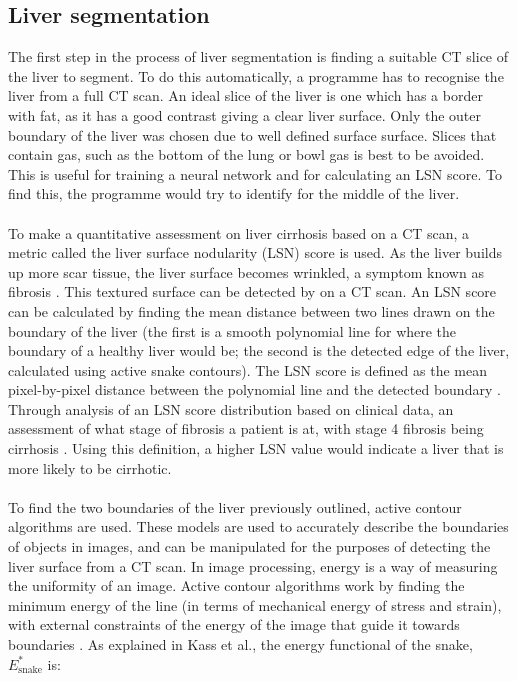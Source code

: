 \documentclass[12pt]{article}
\begin{document}
\subsection{Liver segmentation }
\label{lsn}
The first step in the process of liver segmentation is finding a suitable CT slice of the liver to segment. To do this automatically, a programme has to recognise the liver from a full CT scan. An ideal slice of the liver is one which has a border with fat, as it has a good contrast giving a clear liver surface. Only the outer boundary of the liver was chosen due to well defined surface surface. Slices that contain gas, such as the bottom of the lung or bowl gas is best to be avoided. This is useful for training a neural network and for calculating an LSN score. To find this, the programme would try to identify for the middle of the liver. 
\\ \\ 
To make a quantitative assessment on liver cirrhosis based on a CT scan, a metric called the liver surface nodularity (LSN) score is used. As the liver builds up more scar tissue, the liver surface becomes wrinkled, a symptom known as fibrosis \cite{Wynn:2008aa}. This textured surface can be detected by on a CT scan. An LSN score can be calculated by finding the mean distance between two lines drawn on the boundary of the liver (the first is a smooth polynomial line for where the boundary of a healthy liver would be; the second is the detected edge of the liver, calculated using active snake contours). The LSN score is defined as the mean pixel-by-pixel distance between the polynomial line and the detected boundary \cite{Smith:2016aa} \cite{Sartoris:2018aa} \cite{Kim:2019aa}.  Through analysis of an LSN score distribution based on clinical data, an assessment of what stage of fibrosis a patient is at, with stage 4 fibrosis being cirrhosis \cite{Schuppan:2008aa}. Using this definition, a higher LSN value would indicate a liver that is more likely to be cirrhotic. 
\\ \\
To find the two boundaries of the liver previously outlined, active contour algorithms are used. These models are used to accurately describe the boundaries of objects in images, and can be manipulated for the purposes of detecting the liver surface from a CT scan. In image processing, energy is a way of measuring the uniformity of an image. Active contour algorithms work by finding the minimum energy of the line (in terms of mechanical energy of stress and strain), with external constraints of the energy of the image that guide it towards boundaries \cite{Kass:1988aa}. As explained in Kass et al., the energy functional of the snake, $E^*_{\mathrm{snake}}$ is:
\end{document}
